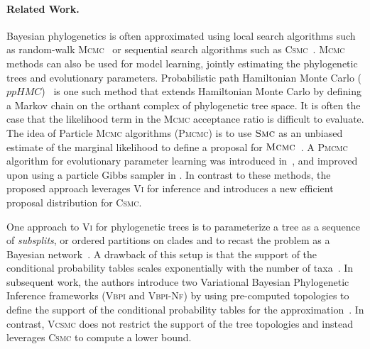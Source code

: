 \documentclass[accepted]{uai2021} %
\theoremstyle{definition}
\begin{document}

\paragraph{Related Work.}
Bayesian phylogenetics is often approximated using local search algorithms such as random-walk \textsc{Mcmc}~\citep{10.1093/bioinformatics/17.8.754} or sequential search algorithms such as \textsc{Csmc}~\citep{[pset]}. 
\textsc{Mcmc} methods can also be used for model learning, jointly estimating the phylogenetic trees and evolutionary parameters. Probabilistic path Hamiltonian Monte Carlo ($ppHMC$)~\citep{pmlr-v70-dinh17a} is one such method that extends Hamiltonian Monte Carlo by defining a Markov chain on the orthant complex of phylogenetic tree space. %
It is often the case that the likelihood term in the \textsc{Mcmc} acceptance ratio is difficult to evaluate. The idea of Particle \textsc{Mcmc} algorithms (\textsc{Pmcmc}) is to use $\textsc{Smc}$ as an unbiased estimate of the marginal likelihood 
to define a proposal for $\textsc{Mcmc}$~\citep{doi:10.1111/j.1467-9868.2009.00736.x}. A \textsc{Pmcmc} algorithm for evolutionary parameter learning was introduced in~\citep{csmc}, and improved upon using a particle Gibbs sampler in \citep{wang2020particle}. %
In contrast to these methods, the proposed approach leverages \textsc{Vi} for inference and introduces a new efficient proposal distribution for \textsc{Csmc}.

One approach to \textsc{Vi} for phylogenetic trees is to parameterize a tree as a sequence of \textit{subsplits}, or ordered partitions on clades and to recast the problem as a Bayesian network~\citep{NIPS2018_7418}. A drawback of this setup is that the support of the conditional probability tables scales exponentially with the number of taxa~\citep{zhang2018variational}. In subsequent work, the authors introduce two Variational Bayesian Phylogenetic Inference frameworks (\textsc{Vbpi} and \textsc{Vbpi-Nf}) by using pre-computed topologies to define the support of the conditional probability tables for the approximation~\citep{zhang2018variational,zhang2020improved}. In contrast, \textsc{Vcsmc} does not restrict the support of the tree topologies and instead leverages \textsc{Csmc} to compute a lower bound.
\end{document}

